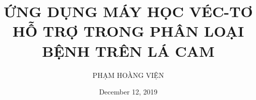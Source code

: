 \title{\textbf{ỨNG DỤNG MÁY HỌC VÉC-TƠ HỖ TRỢ TRONG PHÂN LOẠI BỆNH TRÊN LÁ CAM}}
\author{PHẠM HOÀNG VIỆN}
\date{December 12, 2019}
\maketitle